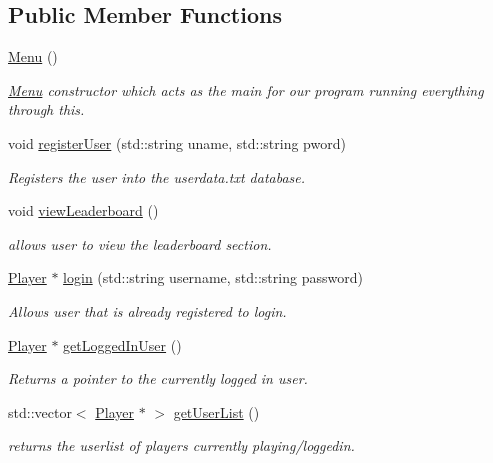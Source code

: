 \subsection*{Public Member Functions}
\begin{DoxyCompactItemize}
\item 
\hyperlink{classMenu_ad466dd83355124a6ed958430450bfe94}{Menu} ()
\begin{DoxyCompactList}\small\item\em \hyperlink{classMenu}{Menu} constructor which acts as the main for our program running everything through this. \end{DoxyCompactList}\item 
void \hyperlink{classMenu_ab9be630400e32b048b2f48ebcbc6303e}{register\+User} (std\+::string uname, std\+::string pword)
\begin{DoxyCompactList}\small\item\em Registers the user into the userdata.\+txt database. \end{DoxyCompactList}\item 
void \hyperlink{classMenu_af8c8f162dc3243212f2da97caac85e46}{view\+Leaderboard} ()
\begin{DoxyCompactList}\small\item\em allows user to view the leaderboard section. \end{DoxyCompactList}\item 
\hyperlink{classPlayer}{Player} $\ast$ \hyperlink{classMenu_a5b7acd7315b89b7db11e0791ef6edc44}{login} (std\+::string username, std\+::string password)
\begin{DoxyCompactList}\small\item\em Allows user that is already registered to login. \end{DoxyCompactList}\item 
\hyperlink{classPlayer}{Player} $\ast$ \hyperlink{classMenu_a8a89cf8a328d06d20edf1a807865c8f6}{get\+Logged\+In\+User} ()
\begin{DoxyCompactList}\small\item\em Returns a pointer to the currently logged in user. \end{DoxyCompactList}\item 
std\+::vector$<$ \hyperlink{classPlayer}{Player} $\ast$ $>$ \hyperlink{classMenu_a1a6c905c9a2bcb5bed082baeb2d4929a}{get\+User\+List} ()
\begin{DoxyCompactList}\small\item\em returns the userlist of players currently playing/loggedin. \end{DoxyCompactList}\end{DoxyCompactItemize}
